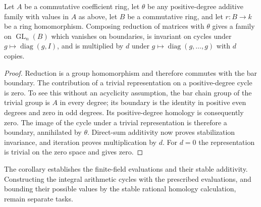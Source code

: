 \begin{corollary}\label{sf-primitive-family}
Let \(A\) be a commutative coefficient ring, let
\(\theta\) be any positive-degree additive family
with values in \(A\) as above, let \(B\) be a commutative ring, and let
\(r:B\to k\) be a ring homomorphism.
Composing reduction of matrices with \(\theta\)
gives a family on \(\operatorname{GL}_n(B)\) which
vanishes on boundaries, is invariant on cycles under
\(g\mapsto\operatorname{diag}(g,I)\), and is
multiplied by \(d\) under
\(g\mapsto\operatorname{diag}(g,\ldots,g)\)
with \(d\) copies.
\end{corollary}
\begin{proof}
Reduction is a group homomorphism and therefore
commutes with the bar boundary.
The contribution of a trivial representation on
a positive-degree cycle is zero.
To see this without an acyclicity assumption,
the bar chain group of the trivial group is \(A\)
in every degree; its boundary is the identity in
positive even degrees and zero in odd degrees.
Its positive-degree homology is consequently zero.
The image of the cycle under a trivial representation
is therefore a boundary, annihilated by \(\theta\).
Direct-sum additivity now proves stabilization
invariance, and iteration proves multiplication
by \(d\).  For \(d=0\) the representation is trivial
on the zero space and gives zero.
\end{proof}

The corollary establishes the finite-field evaluations and
their stable additivity.  Constructing
the integral arithmetic cycles with the prescribed
evaluations, and bounding their possible values by
the stable rational homology calculation, remain
separate tasks.


